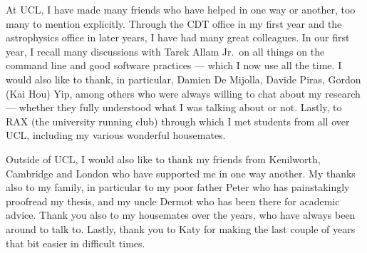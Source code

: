 \begin{acknowledgements}
	At UCL, I have made many friends who have helped in one way or another, too many to mention explicitly.
	Through the CDT office in my first year and the astrophysics office in later years, I have had many great colleagues.
	In our first year, I recall many discussions with Tarek Allam Jr.\ on all things on the command line and good software practices --- which I now use all the time.
	I would also like to thank, in particular, Damien De Mijolla, Davide Piras, Gordon (Kai Hou) Yip, among others who were always willing to chat about my research --- whether they fully understood what I was talking about or not.
	Lastly, to RAX (the university running club) through which I met students from all over UCL, including my various wonderful housemates.

	Outside of UCL, I would also like to thank my friends from Kenilworth, Cambridge and London who have supported me in one way another.
	My thanks also to my family, in particular to my poor father Peter who has painstakingly proofread my thesis, and my uncle Dermot who has been there for academic advice.
	Thank you also to my housemates over the years, who have always been around to talk to.
	Lastly, thank you to Katy for making the last couple of years that bit easier in difficult times.
\end{acknowledgements}

\setcounter{tocdepth}{2}

\tableofcontents
\listoffigures
\listoftables
